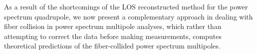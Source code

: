                                                                                                                                                                                                                                                                          As a result of the shortcomings of the LOS reconstructed method for the power spectrum 
                                                                                                                                                                                                                                                                         quadrupole, we now present a complementary approach in dealing with fiber collision 
                                                                                                                                                                                                                                                                         in power spectrum multipole analyses, which rather than attempting to correct the 
                                                                                                                                                                                                                                                                         data before making measurements, computes theoretical predictions of the fiber-collided 
                                                                                                                                                                                                                                                                         power spectrum multipoles. 

